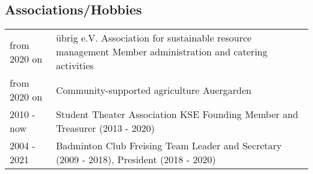 \documentclass[a4paper,10pt]{memoir}
\begin{document}
\subsection*{Associations/Hobbies}
\vspace*{-\baselineskip}
\begin{longtable}{@{}p{} p{}}
  from 2020 on &
  übrig e.V. Association for sustainable resource management \newline
  Member administration and catering activities
  \\
  from 2020 on &
  Community-supported agriculture Auergarden
  \\
  2010 - now &
  Student Theater Association KSE \newline
  Founding Member and Treasurer (2013 - 2020)
  \\
  2004 - 2021 &
  Badminton Club Freising \newline
  Team Leader and Secretary (2009 - 2018), President (2018 - 2020)
\end{longtable}
\end{document}
